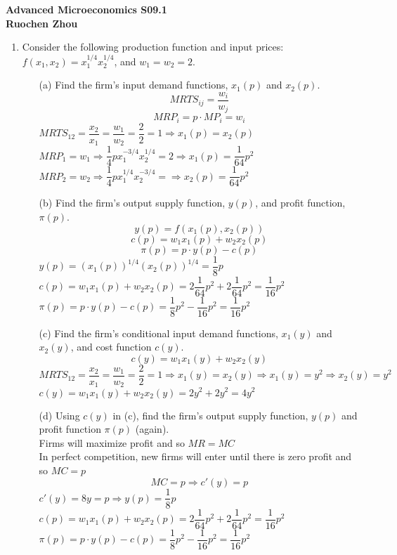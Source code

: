 \documentclass[11pt]{article}
\begin{document}
\begin{center}
\textbf{Advanced Microeconomics S09.1\\}
\textbf{Ruochen Zhou}
\end{center}

\begin{enumerate}
\item Consider the following production function and input prices: $f(x_{1},x_{2})=x_{1}^{1/4}x_{2}^{1/4}$, and $w_{1}=w_{2}=2$.
	\begin{itemize}
	\item[(a)] Find the firm's input demand functions, $x_{1}(p)$ and $x_{2}(p)$.
	\medskip\\
	$$MRTS_{ij}=\dfrac{w_i}{w_j}$$
    $$MRP_i=p\cdot MP_i=w_i$$
    $MRTS_{12}=\dfrac{x_2}{x_1}=\dfrac{w_1}{w_2}=\dfrac{2}{2}=1\Rightarrow x_1(p)=x_2(p)$\\
	$MRP_1=w_1\Rightarrow\dfrac{1}{4}px_1^{-3/4}x_2^{1/4}=2\Rightarrow x_1(p)=\dfrac{1}{64}p^2$\\
	$MRP_2=w_2\Rightarrow\dfrac{1}{4}px_1^{1/4}x_2^{-3/4}=\Rightarrow x_2(p)=\dfrac{1}{64}p^2$\\
	\item[(b)] Find the firm's output supply function, $y(p)$, and profit function, $\pi(p)$.
	\medskip\\
	$$y(p)=f(x_1(p),x_2(p))$$
	$$c(p)=w_1x_1(p)+w_2x_2(p)$$
	$$\pi(p)=p\cdot y(p)-c(p)$$
	$y(p)=(x_1(p))^{1/4}(x_2(p))^{1/4}=\dfrac{1}{8}p$\\
	$c(p)=w_1x_1(p)+w_2x_2(p)=2\dfrac{1}{64}p^2+2\dfrac{1}{64}p^2=\dfrac{1}{16}p^2$\\
	$\pi(p)=p\cdot y(p)-c(p)=\dfrac{1}{8}p^2-\dfrac{1}{16}p^2=\dfrac{1}{16}p^2$
	\item[(c)] Find the firm's conditional input demand functions, $x_{1}(y)$ and $x_{2}(y)$, and cost function $c(y)$.
	\medskip\\
	$$c(y)=w_1x_1(y)+w_2x_2(y)$$
	$MRTS_{12}=\dfrac{x_2}{x_1}=\dfrac{w_1}{w_2}=\dfrac{2}{2}=1\Rightarrow x_1(y)=x_2(y)\Rightarrow x_1(y)=y^2\Rightarrow x_2(y)=y^2$\\
	$c(y)=w_1x_1(y)+w_2x_2(y)=2y^2+2y^2=4y^2$\\
    \item[(d)] Using $c(y)$ in (c), find the firm's output supply function, $y(p)$ and profit function $\pi(p)$ (again).
    \medskip\\
    Firms will maximize profit and so $MR=MC$\\
    In perfect competition, new firms will enter until there is zero profit and so $MC=p$
    $$MC=p\Rightarrow c'(y)=p$$
    $c'(y)=8y=p\Rightarrow y(p)=\dfrac{1}{8}p$\\
    $c(p)=w_1x_1(p)+w_2x_2(p)=2\dfrac{1}{64}p^2+2\dfrac{1}{64}p^2=\dfrac{1}{16}p^2$\\
    $\pi(p)=p\cdot y(p)-c(p)=\dfrac{1}{8}p^2-\dfrac{1}{16}p^2=\dfrac{1}{16}p^2$
	\end{itemize}


\end{enumerate}
\end{document}
